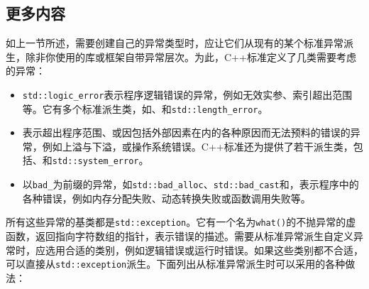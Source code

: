 
\subsection{更多内容}



如上一节所述，需要创建自己的异常类型时，应让它们从现有的某个标准异常派生，除非你使用的库或框架自带异常层次。为此，C++标准定义了几类需要考虑的异常：



\begin{itemize}
\item \texttt{std::\allowbreak{}logic\_\allowbreak{}error}表示程序逻辑错误的异常，例如无效实参、索引超出范围等。它有多个标准派生类，如、和\texttt{std::\allowbreak{}length\_\allowbreak{}error}。



\item {}表示超出程序范围、或因包括外部因素在内的各种原因而无法预料的错误的异常，例如上溢与下溢，或操作系统错误。C++标准还为提供了若干派生类，包括、和\texttt{std::\allowbreak{}system\_\allowbreak{}error}。



\item 以\texttt{bad\_}为前缀的异常，如\texttt{std::\allowbreak{}bad\_\allowbreak{}alloc}、\texttt{std::\allowbreak{}bad\_\allowbreak{}cast}和，表示程序中的各种错误，例如内存分配失败、动态转换失败或函数调用失败等。

\end{itemize}



所有这些异常的基类都是\texttt{std::\allowbreak{}exception}。它有一个名为\texttt{what()}的不抛异常的虚函数，返回指向字符数组的指针，表示错误的描述。需要从标准异常派生自定义异常时，应选用合适的类别，例如逻辑错误或运行时错误。如果这些类别都不合适，可以直接从\texttt{std::\allowbreak{}exception}派生。下面列出从标准异常派生时可以采用的各种做法：



